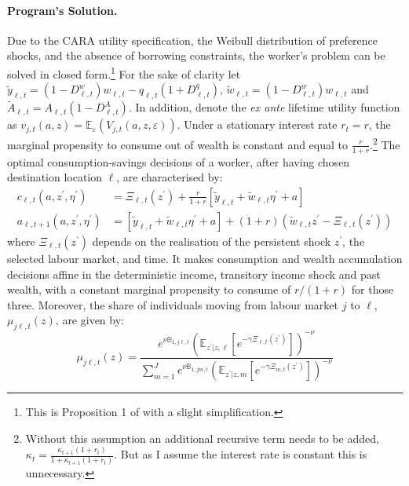 \documentclass[12pt, a4paper]{article}
\begin{document}
\paragraph{Program's Solution.} Due to the CARA utility specification, the Weibull distribution of preference shocks, and the absence of borrowing constraints, the worker's problem can be solved in closed form.\footnote{This is Proposition 1 of \citet{dvorkin_geography_2025} with a slight simplification.} For the sake of clarity let $\tilde{y}_{\ell,t} = (1 - D^w_{\ell,t})w_{\ell,t} - q_{\ell,t}(1+ D^q_{\ell,t})$,  $\tilde{w}_{\ell,t} = (1 - D^w_{\ell,t})w_{\ell,t}$ and $\tilde{A}_{\ell,t} = A_{\ell,t}(1 - D^A_{\ell,t})$. In addition, denote the \textit{ex ante} lifetime utility function as $v_{j,t}(a, z) = \mathbb{E}_\varepsilon\left(V_{j,t}(a, z, \varepsilon)\right)$. Under a stationary interest rate $r_t = r$, the marginal propensity to consume out of wealth is constant and equal to $\frac{r}{1+r}$.\footnote{Without this assumption an additional recursive term needs to be added, $\kappa_t = \frac{\kappa_{t+1}(1+r_t)}{1+\kappa_{t+1}(1+r_t)}$. But as I assume the interest rate is constant this is unnecessary.} The optimal consumption-savings decisions of a worker, after having chosen destination location $\ell$, are characterised by:
\begin{align}
c_{\ell,t}(a, z^\prime, \eta^\prime) &= \Xi_{\ell,t}(z^\prime) + \frac{r}{1+r} \left[ \tilde{y}_{\ell,t} + \tilde{w}_{\ell,t}\eta^\prime + a \right] \label{eq:cpol} \\
a_{\ell,t+1}(a, z^\prime, \eta^\prime) &= \left[ \tilde{y}_{\ell,t} + \tilde{w}_{\ell,t}\eta^\prime + a \right] + (1+r) \left( \tilde{w}_{\ell,t}z^\prime - \Xi_{\ell,t}(z^\prime) \right) \label{eq:apol}
\end{align}
where $\Xi_{\ell,t}(z^\prime)$ depends on the realisation of the persistent shock $z^\prime$, the selected labour market, and time. It makes consumption and wealth accumulation decisions affine in the deterministic income, transitory income shock and past wealth, with a constant marginal propensity to consume of $r/(1+r)$ for those three. Moreover, the share of individuals moving from labour market $j$ to $\ell$, $\mu_{j\ell,t}(z)$, are given by:
\begin{equation}
\mu_{j\ell,t}(z) = \frac{ e^{\nu \mathbb{B}_{1,j\ell,t}} \left( \mathbb{E}_{z^\prime | z, \ell} \left[ e^{-\gamma \Xi_{\ell,t}(z^\prime)} \right] \right)^{-\nu} }{ \sum_{m=1}^J e^{\nu \mathbb{B}_{1,jm,t}} \left( \mathbb{E}_{z^\prime | z, m} \left[ e^{-\gamma \Xi_{m,t}(z^\prime)} \right] \right)^{-\nu} }
\label{eq:mu}
\end{equation}
\end{document}
